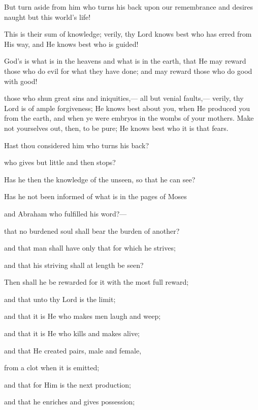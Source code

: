 \documentclass[fontsize=14pt, letterpaper, notitlepage, openany, DIV=12]{scrbook} %
\begin{document}
\noindent[53:29]
But turn aside from him who turns his back upon our remembrance and desires naught
but this world's life!

\noindent[53:30]
This is their sum of knowledge; verily, thy Lord knows best who has erred from His way,
and He knows best who is guided!

\noindent[53:31]
God's is what is in the heavens and what is in the earth, that He may reward those who do
evil for what they have done; and may reward those who do good with good!

\noindent[53:32]
those who shun great sins and iniquities,--- all but venial faults,--- verily, thy Lord is of
ample forgiveness; He knows best about you, when He produced you from the earth, and when
ye were embryos in the wombs of your mothers. Make not yourselves out, then, to be pure; He
knows best who it is that fears.

\noindent[53:33]
Hast thou considered him who turns his back?

\noindent[53:34]
who gives but little and then stops?

\noindent[53:35]
Has he then the knowledge of the unseen, so that he can see?

\noindent[53:36]
Has he not been informed of what is in the pages of Moses

\noindent[53:37]
and Abraham who fulfilled his word?---

\noindent[53:38]
that no burdened soul shall bear the burden of another?

\noindent[53:39]
and that man shall have only that for which he strives;

\noindent[53:40]
and that his striving shall at length be seen?

\noindent[53:41]
Then shall he be rewarded for it with the most full reward;

\noindent[53:42]
and that unto thy Lord is the limit;

\noindent[53:43]
and that it is He who makes men laugh and weep;

\noindent[53:44]
and that it is He who kills and makes alive;

\noindent[53:45]
and that He created pairs, male and female,

\noindent[53:46]
from a clot when it is emitted;

\noindent[53:47]
and that for Him is the next production;

\noindent[53:48]
and that he enriches and gives possession;
\end{document}
